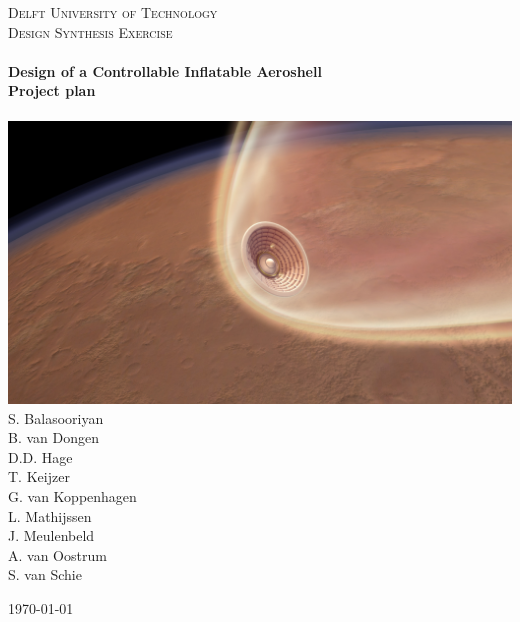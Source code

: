\begin{titlepage}
\begin{center}

\textsc{\LARGE Delft University of Technology}\\[0.3cm]
\textsc{\Large Design Synthesis Exercise}\\[0.5cm]

\HRule \\[0.4cm]
{\Large \bfseries Design of a Controllable Inflatable Aeroshell}\\[0.2cm]
{\Huge \bfseries Project plan}\\[0.2cm]
\HRule \\[1.2cm]

\includegraphics[scale=0.4]{./Titlepage/coverpicture}\\[1cm]

S. Balasooriyan \\
B. van Dongen \\
D.D. Hage \\
T. Keijzer \\
G. van Koppenhagen \\
L. Mathijssen \\
J. Meulenbeld \\
A. van Oostrum	\\
S. van Schie \\




\vfill

\begin{large}\today \end{large}

\end{center}
\end{titlepage}